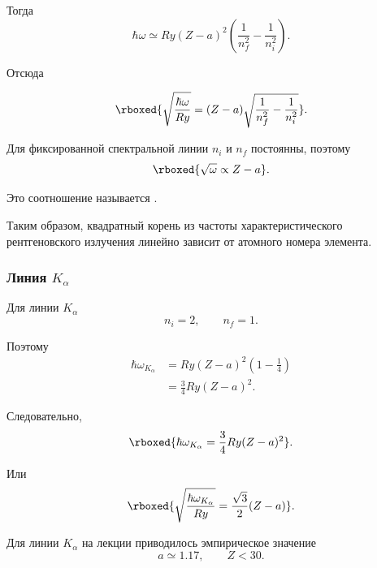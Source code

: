\documentclass[../final.tex]{subfiles}
\begin{document}
Тогда
\begin{equation*}
    \hbar\omega
    \simeq
    Ry(Z-a)^2
    \left(
        \frac{1}{n_f^2}
        -
        \frac{1}{n_i^2}
    \right).
\end{equation*}

Отсюда

\begin{equation*}
    \rboxed{
        \sqrt{\frac{\hbar\omega}{Ry}}
        =
        (Z-a)
        \sqrt{
            \frac{1}{n_f^2}
            -
            \frac{1}{n_i^2}
        }
    }.
\end{equation*}


Для фиксированной спектральной линии \(n_i\) и \(n_f\) постоянны,
поэтому
\begin{equation*}
    \rboxed{
        \sqrt{\omega}
        \propto
        Z-a
    }.
\end{equation*}

Это соотношение называется .

Таким образом, квадратный корень из частоты характеристического
рентгеновского излучения линейно зависит от атомного номера элемента.

\subsubsection{Линия \(K_\alpha\)}

Для линии \(K_\alpha\)
\begin{equation*}
    n_i=2,
    \qquad
    n_f=1.
\end{equation*}

Поэтому
\begin{align*}
    \hbar\omega_{K_\alpha}
    &=
    Ry(Z-a)^2
    \left(
        1-\frac14
    \right)
    \\
    &=
    \frac34
    Ry(Z-a)^2.
\end{align*}

Следовательно,
\begin{equation*}
    \rboxed{
        \hbar\omega_{K_\alpha}
        =
        \frac34
        Ry(Z-a)^2
    }.
\end{equation*}

Или
\begin{equation*}
    \rboxed{
        \sqrt{
            \frac{\hbar\omega_{K_\alpha}}{Ry}
        }
        =
        \frac{\sqrt3}{2}(Z-a)
    }.
\end{equation*}

Для линии \(K_\alpha\) на лекции приводилось эмпирическое значение
\begin{equation*}
    a\simeq1.17,
    \qquad
    Z<30.
\end{equation*}
\end{document}
